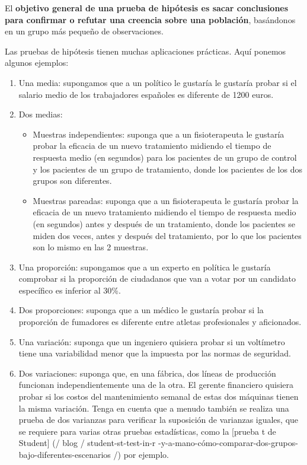 \documentclass[
]{book}
\providecommand{\tightlist}{%
  \setlength{\itemsep}{0pt}\setlength{\parskip}{0pt}}
\begin{document}
El \textbf{objetivo general de una prueba de hipótesis es sacar conclusiones para confirmar o refutar una creencia sobre una población}, basándonos en un grupo más pequeño de observaciones.

Las pruebas de hipótesis tienen muchas aplicaciones prácticas. Aquí ponemos algunos ejemplos:

\begin{enumerate}
\def\labelenumi{\arabic{enumi}.}
\tightlist
\item
  Una media: supongamos que a un político le gustaría le gustaría probar si el salario medio de los trabajadores españoles es diferente de 1200 euros.
\item
  Dos medias:

  \begin{itemize}
  \tightlist
  \item
    Muestras independientes: suponga que a un fisioterapeuta le gustaría probar la eficacia de un nuevo tratamiento midiendo el tiempo de respuesta medio (en segundos) para los pacientes de un grupo de control y los pacientes de un grupo de tratamiento, donde los pacientes de los dos grupos son diferentes.
  \item
    Muestras pareadas: suponga que a un fisioterapeuta le gustaría probar la eficacia de un nuevo tratamiento midiendo el tiempo de respuesta medio (en segundos) antes y después de un tratamiento, donde los pacientes se miden dos veces, antes y después del tratamiento, por lo que los pacientes son lo mismo en las 2 muestras.
  \end{itemize}
\item
  Una proporción: supongamos que a un experto en política le gustaría comprobar si la proporción de ciudadanos que van a votar por un candidato específico es inferior al 30\%.
\item
  Dos proporciones: suponga que a un médico le gustaría probar si la proporción de fumadores es diferente entre atletas profesionales y aficionados.
\item
  Una variación: suponga que un ingeniero quisiera probar si un voltímetro tiene una variabilidad menor que la impuesta por las normas de seguridad.
\item
  Dos variaciones: suponga que, en una fábrica, dos líneas de producción funcionan independientemente una de la otra. El gerente financiero quisiera probar si los costos del mantenimiento semanal de estas dos máquinas tienen la misma variación. Tenga en cuenta que a menudo también se realiza una prueba de dos varianzas para verificar la suposición de varianzas iguales, que se requiere para varias otras pruebas estadísticas, como la {[}prueba t de Student{]} (/ blog / student-st-test-in-r -y-a-mano-cómo-comparar-dos-grupos-bajo-diferentes-escenarios /) por ejemplo.
\end{enumerate}
\end{document}
